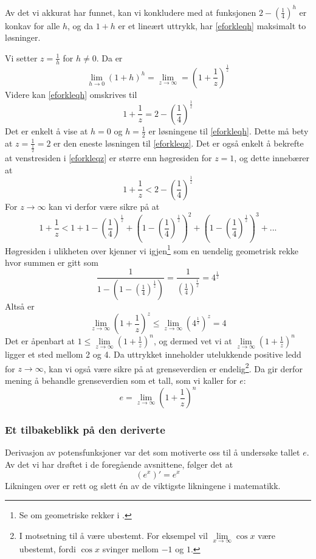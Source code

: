 Av det vi akkurat har funnet, kan vi konkludere med at funksjonen $2-\left(\frac{1}{4}\right)^h $ er konkav for alle $ h $, og da $ 1+h$ er et lineært uttrykk, har \eqref{eforkleqh} maksimalt to løsninger.\vsk

Vi setter $z=\frac{1}{h} $ for $ h\neq0 $. Da er
\[ \lim\limits_{h\to 0} (1+h)^h=\lim\limits_{z\to\infty}=\left(1+\frac{1}{z}\right)^\frac{1}{z} \]
Videre kan \eqref{eforkleqh} omskrives til
\begin{equation}\label{eforkleqz}
	1+\frac{1}{z}=2-\left(\frac{1}{4}\right)^\frac{1}{z}
\end{equation}
Det er enkelt å vise at $ h=0 $ og $ h=\frac{1}{2} $ er løsningene til \eqref{eforkleqh}. Dette må bety at $ z=\frac{1}{\frac{1}{2}}=2 $ er den eneste løsningen til \eqref{eforkleqz}. Det er også enkelt å bekrefte at venstresiden i \eqref{eforkleqz} er større enn høgresiden for $ z=1 $, og dette innebærer at
\[ 1+\frac{1}{z}<2-\left(\frac{1}{4}\right)^\frac{1}{z} \]
For $ z\to\infty $ kan vi derfor være sikre på at
\[ 1+\frac{1}{z}<1+1-\left(\frac{1}{4}\right)^\frac{1}{z}+\left(1-\left(\frac{1}{4}\right)^\frac{1}{z}\right)^2+\left(1-\left(\frac{1}{4}\right)^\frac{1}{z}\right)^3+... \]
Høgresiden i ulikheten over kjenner vi igjen\footnote{Se om geometriske rekker i \tmto.} som en uendelig geometrisk rekke hvor summen er gitt som
\[ \frac{1}{1-\left(1-\left(\frac{1}{4}\right)^\frac{1}{z}\right)} =\frac{1}{\left(\frac{1}{4}\right)^\frac{1}{z}}=4^\frac{1}{z} \]
Altså er
\begin{equation}\label{eforkllim4}
	\lim\limits_{z\to\infty}\left(1+\frac{1}{z}\right)^z\leq \lim\limits_{z\to\infty}\left(4^\frac{1}{z}\right)^z=4
\end{equation}
Det er åpenbart at $ 1\leq\lim\limits_{z\to\infty }\left(1+\frac{1}{z}\right)^n$,
og dermed vet vi at $ \lim\limits_{z\to\infty }\left(1+\frac{1}{z}\right)^n $ ligger et sted mellom 2 og 4.
Da uttrykket inneholder utelukkende positive ledd for $ {z\to\infty} $, kan vi også være sikre på at grenseverdien er endelig\footnote{I motsetning til å være ubestemt. For eksempel vil $ \lim\limits_{x\to \infty} \cos x $  være ubestemt, fordi $ \cos x $ svinger mellom $ -1 $ og $ 1 $.}. Da gir derfor mening å behandle grenseverdien som et tall, som vi kaller for $ e $:
\[ e=\lim\limits_{z\to\infty }\left(1+\frac{1}{z}\right)^n  \]
\subsubsection{Et tilbakeblikk på den deriverte}
Derivasjon av potensfunksjoner var det som motiverte oss til å undersøke tallet $ e $. Av det vi har drøftet i de foregående avsnittene, følger det at
\[ \left(e^x\right)'=e^x \]
Likningen over er rett og slett én av de viktigste likningene i matematikk.

